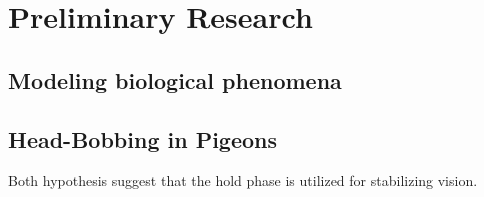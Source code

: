 \section{Preliminary Research}
\subsection{Modeling biological phenomena}

\subsection{Head-Bobbing in Pigeons}
  Both hypothesis suggest that the hold phase is utilized for stabilizing vision.
